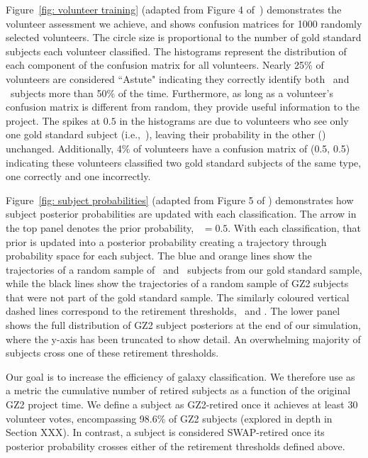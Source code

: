 Figure~\ref{fig: volunteer training} (adapted from Figure 4 of~\citealt{Marshall2016}) demonstrates the volunteer assessment we achieve, and shows confusion matrices for 1000 randomly selected volunteers. The circle size is proportional to the number of gold standard subjects each volunteer classified. The histograms represent the distribution of each component of the confusion matrix for all volunteers. Nearly 25\% of volunteers are considered ``Astute"  indicating they correctly identify both \feat~and \notfeat~subjects more than 50\% of the time. Furthermore, as long as a volunteer's confusion matrix is different from random, they provide useful information to the project. The spikes at $0.5$ in the histograms are due to volunteers who see only one gold standard subject (i.e.,~\feat), leaving their probability in the other (\notfeat) unchanged. Additionally, 4\% of volunteers have a confusion matrix of (0.5, 0.5) indicating these volunteers classified two gold standard subjects of the same type, one correctly and one incorrectly. 

Figure~\ref{fig: subject probabilities} (adapted from Figure 5 of \citealt{Marshall2016}) demonstrates how subject posterior probabilities are updated with each classification. The arrow in the top panel denotes the prior probability, \p~$=0.5$. With each classification, that prior is updated into a posterior probability creating a trajectory through probability space for each subject. The blue and orange lines show the trajectories of a random sample of \feat~and \notfeat~subjects from our gold standard sample, while the black lines show the trajectories of a random sample of GZ2 subjects that were not part of the gold standard  sample. The similarly coloured vertical dashed lines correspond to the retirement thresholds, \tf~and \tn. The lower panel shows the full distribution of GZ2 subject posteriors at the end of our simulation, where the y-axis has been truncated to show detail. An overwhelming majority of subjects cross one of these retirement thresholds.

Our goal is to increase the efficiency of galaxy classification. We therefore  use as a metric the cumulative number of retired subjects as a function of the original GZ2 project time. We define a subject as GZ2-retired once it achieves at least 30 volunteer votes, encompassing 98.6\% of GZ2 subjects (explored in depth in Section XXX).  In contrast, a subject is considered SWAP-retired once its posterior probability crosses either of the retirement thresholds defined above. 

